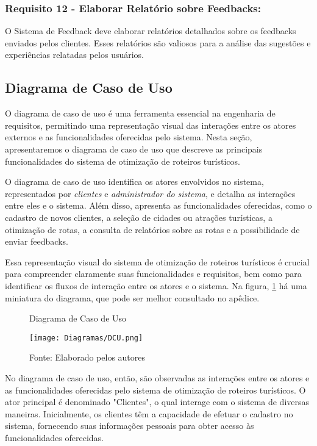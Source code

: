 \subsubsection{Requisito 12 - Elaborar Relatório sobre Feedbacks:} O Sistema de Feedback deve elaborar relatórios detalhados sobre os feedbacks enviados pelos clientes. Esses relatórios são valiosos para a análise das sugestões e experiências relatadas pelos usuários.

\subsection{Diagrama de Caso de Uso}

O diagrama de caso de uso é uma ferramenta essencial na engenharia de requisitos, permitindo uma representação visual das interações entre os atores externos e as funcionalidades oferecidas pelo sistema. Nesta seção, apresentaremos o diagrama de caso de uso que descreve as principais funcionalidades do sistema de otimização de roteiros turísticos.

O diagrama de caso de uso identifica os atores envolvidos no sistema, representados por \textit{clientes} e \textit{administrador do sistema}, e detalha as interações entre eles e o sistema. Além disso, apresenta as funcionalidades oferecidas, como o cadastro de novos clientes, a seleção de cidades ou atrações turísticas, a otimização de rotas, a consulta de relatórios sobre as rotas e a possibilidade de enviar feedbacks.

Essa representação visual do sistema de otimização de roteiros turísticos é crucial para compreender claramente suas funcionalidades e requisitos, bem como para identificar os fluxos de interação entre os atores e o sistema. Na figura, \ref{fig:DCU} há uma miniatura do diagrama, que pode ser melhor consultado no apêdice.


\begin{figure}[H]
    \centering
    \caption{Diagrama de Caso de Uso}
    \label{fig:DCU}
    \texttt{[image: Diagramas/DCU.png]}\\
    \caption*{Fonte: Elaborado pelos autores}
\end{figure}

No diagrama de caso de uso, então, são observadas as interações entre os atores e as funcionalidades oferecidas pelo sistema de otimização de roteiros turísticos. O ator principal é denominado "Clientes", o qual interage com o sistema de diversas maneiras. Inicialmente, os clientes têm a capacidade de efetuar o cadastro no sistema, fornecendo suas informações pessoais para obter acesso às funcionalidades oferecidas.

